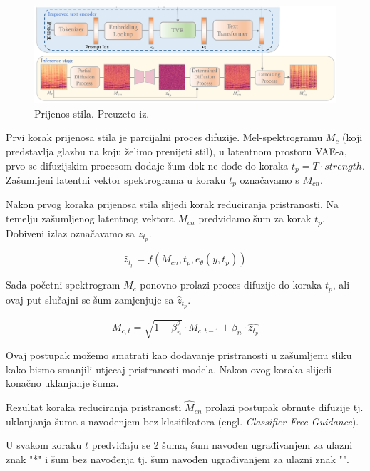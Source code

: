 \begin{figure}[H]
    \centering
\includegraphics[width=0.9\linewidth]{imgs/inference.png}
    \caption{Prijenos stila. Preuzeto iz\cite{huang2024musicstyletransferdiffusion}.}
    \label{fig:inference}
\end{figure}

Prvi korak prijenosa stila je parcijalni proces difuzije. Mel-spektrogramu $M_c$ (koji predstavlja glazbu na koju želimo prenijeti stil), u latentnom prostoru VAE-a, prvo se difuzijskim procesom dodaje šum dok ne dođe do koraka $t_p = T \cdot strength$. Zašumljeni latentni vektor spektrograma u koraku $t_p$ označavamo s $M_{cn}$. 
  
Nakon prvog koraka prijenosa stila slijedi korak reduciranja pristranosti. Na temelju zašumljenog latentnog vektora $M_{cn}$ predviđamo šum za korak $t_p$. Dobiveni izlaz označavamo sa $\hat{z}_{t_p}$.

\begin{equation}
    \hat{z}_{t_p} = f(M_{cn}, t_p, e_\theta(y, t_p))
\end{equation}

Sada početni spektrogram $M_c$ ponovno prolazi proces difuzije do koraka $t_p$, ali ovaj put slučajni se šum zamjenjuje sa $\hat{z}_{t_p}$. 

\begin{equation}
    M_{c,t} = \sqrt{1 - \beta_n^2} \cdot M_{c,t-1} + \beta_n \cdot \hat{z_{t_p}}
    \label{eq:difusion2}
\end{equation}

Ovaj postupak možemo smatrati kao dodavanje pristranosti u zašumljenu sliku kako bismo smanjili utjecaj pristranosti modela. Nakon ovog koraka slijedi konačno uklanjanje šuma.

Rezultat koraka reduciranja pristranosti $\hat{M}_{cn}$ prolazi postupak obrnute difuzije tj. uklanjanja šuma s navođenjem bez klasifikatora (engl. \textit{Classifier-Free Guidance}). 

U svakom koraku $t$ predviđaju se 2 šuma, šum navođen ugrađivanjem za ulazni znak "*" i šum bez navođenja tj. šum navođen ugrađivanjem za ulazni znak "". 

